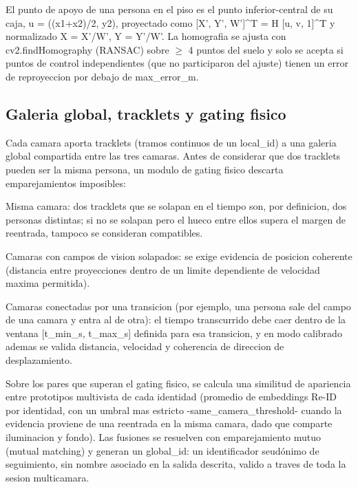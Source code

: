 \documentclass[12pt,letterpaper]{article}
\begin{document}
El punto de apoyo de una persona en el piso es el punto inferior-central de su caja, u = ((x1+x2)/2, y2), proyectado como [X', Y', W']\textasciicircum{}T = H [u, v, 1]\textasciicircum{}T y normalizado X = X'/W', Y = Y'/W'. La homografia se ajusta con cv2.findHomography (RANSAC) sobre $\geq$ 4 puntos del suelo y solo se acepta si puntos de control independientes (que no participaron del ajuste) tienen un error de reproyeccion por debajo de max\_\allowbreak error\_\allowbreak m.


\subsection{Galeria global, tracklets y gating fisico}

Cada camara aporta tracklets (tramos continuos de un local\_\allowbreak id) a una galeria global compartida entre las tres camaras. Antes de considerar que dos tracklets pueden ser la misma persona, un modulo de gating fisico descarta emparejamientos imposibles:


Misma camara: dos tracklets que se solapan en el tiempo son, por definicion, dos personas distintas; si no se solapan pero el hueco entre ellos supera el margen de reentrada, tampoco se consideran compatibles.


Camaras con campos de vision solapados: se exige evidencia de posicion coherente (distancia entre proyecciones dentro de un limite dependiente de velocidad maxima permitida).


Camaras conectadas por una transicion (por ejemplo, una persona sale del campo de una camara y entra al de otra): el tiempo transcurrido debe caer dentro de la ventana [t\_\allowbreak min\_\allowbreak s, t\_\allowbreak max\_\allowbreak s] definida para esa transicion, y en modo calibrado ademas se valida distancia, velocidad y coherencia de direccion de desplazamiento.


Sobre los pares que superan el gating fisico, se calcula una similitud de apariencia entre prototipos multivista de cada identidad (promedio de embeddings Re-ID por identidad, con un umbral mas estricto -same\_\allowbreak camera\_\allowbreak threshold- cuando la evidencia proviene de una reentrada en la misma camara, dado que comparte iluminacion y fondo). Las fusiones se resuelven con emparejamiento mutuo (mutual matching) y generan un global\_\allowbreak id: un identificador seudónimo de seguimiento, sin nombre asociado en la salida descrita, valido a traves de toda la sesion multicamara.
\end{document}

